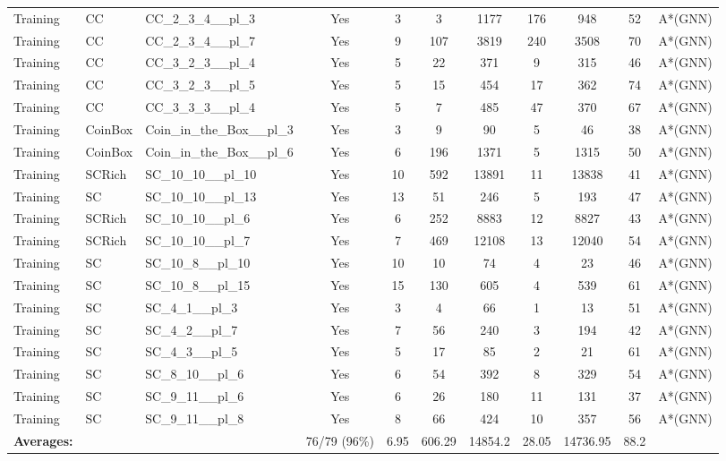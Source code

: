 \documentclass{article}
\begin{document}
\begin{tabular}{lllcccccccc}
Training & CC & CC\_2\_3\_4\_\_pl\_3 & Yes & 3 & 3 & 1177 & 176 & 948 & 52 & A*(GNN) \\
Training & CC & CC\_2\_3\_4\_\_pl\_7 & Yes & 9 & 107 & 3819 & 240 & 3508 & 70 & A*(GNN) \\
Training & CC & CC\_3\_2\_3\_\_pl\_4 & Yes & 5 & 22 & 371 & 9 & 315 & 46 & A*(GNN) \\
Training & CC & CC\_3\_2\_3\_\_pl\_5 & Yes & 5 & 15 & 454 & 17 & 362 & 74 & A*(GNN) \\
Training & CC & CC\_3\_3\_3\_\_pl\_4 & Yes & 5 & 7 & 485 & 47 & 370 & 67 & A*(GNN) \\
Training & CoinBox & Coin\_in\_the\_Box\_\_pl\_3 & Yes & 3 & 9 & 90 & 5 & 46 & 38 & A*(GNN) \\
Training & CoinBox & Coin\_in\_the\_Box\_\_pl\_6 & Yes & 6 & 196 & 1371 & 5 & 1315 & 50 & A*(GNN) \\
Training & SCRich & SC\_10\_10\_\_pl\_10 & Yes & 10 & 592 & 13891 & 11 & 13838 & 41 & A*(GNN) \\
Training & SC & SC\_10\_10\_\_pl\_13 & Yes & 13 & 51 & 246 & 5 & 193 & 47 & A*(GNN) \\
Training & SCRich & SC\_10\_10\_\_pl\_6 & Yes & 6 & 252 & 8883 & 12 & 8827 & 43 & A*(GNN) \\
Training & SCRich & SC\_10\_10\_\_pl\_7 & Yes & 7 & 469 & 12108 & 13 & 12040 & 54 & A*(GNN) \\
Training & SC & SC\_10\_8\_\_pl\_10 & Yes & 10 & 10 & 74 & 4 & 23 & 46 & A*(GNN) \\
Training & SC & SC\_10\_8\_\_pl\_15 & Yes & 15 & 130 & 605 & 4 & 539 & 61 & A*(GNN) \\
Training & SC & SC\_4\_1\_\_pl\_3 & Yes & 3 & 4 & 66 & 1 & 13 & 51 & A*(GNN) \\
Training & SC & SC\_4\_2\_\_pl\_7 & Yes & 7 & 56 & 240 & 3 & 194 & 42 & A*(GNN) \\
Training & SC & SC\_4\_3\_\_pl\_5 & Yes & 5 & 17 & 85 & 2 & 21 & 61 & A*(GNN) \\
Training & SC & SC\_8\_10\_\_pl\_6 & Yes & 6 & 54 & 392 & 8 & 329 & 54 & A*(GNN) \\
Training & SC & SC\_9\_11\_\_pl\_6 & Yes & 6 & 26 & 180 & 11 & 131 & 37 & A*(GNN) \\
Training & SC & SC\_9\_11\_\_pl\_8 & Yes & 8 & 66 & 424 & 10 & 357 & 56 & A*(GNN) \\
\textbf{Averages:} & & & 76/79 (96\%) & 6.95 & 606.29 & 14854.2 & 28.05 & 14736.95 & 88.2 & \\
\bottomrule
\end{tabular}
\newpage
\end{document}

